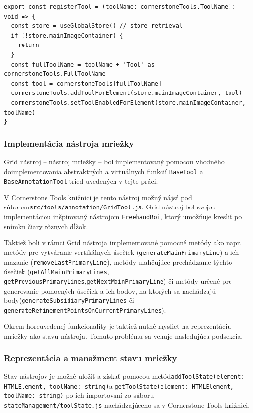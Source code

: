 \begin{minipage}[]{\linewidth}
\begin{verbatim}
export const registerTool = (toolName: cornerstoneTools.ToolName): void => {
  const store = useGlobalStore() // store retrieval
  if (!store.mainImageContainer) {
    return
  }
  const fullToolName = toolName + 'Tool' as cornerstoneTools.FullToolName
  const tool = cornerstoneTools[fullToolName]
  cornerstoneTools.addToolForElement(store.mainImageContainer, tool)
  cornerstoneTools.setToolEnabledForElement(store.mainImageContainer, toolName)
}
\end{verbatim}
\end{minipage}

\subsubsection {Implementácia nástroja mriežky}
Grid nástroj -- nástroj mriežky -- bol implementovaný pomocou vhodného doimplementovania abstraktných a virtuálnych funkcií \texttt{BaseTool} a \texttt{BaseAnnotationTool} tried uvedených v tejto práci.

V Cornerstone Tools knižnici je tento nástroj možný nájsť pod súborom\newline \texttt{src/tools/annotation/GridTool.js}. Grid nástroj bol svojou implementáciou inšpirovaný nástrojom \texttt{FreehandRoi}, ktorý umožňuje kresliť po snímku čiary rôznych dĺžok.

Taktiež boli v rámci Grid nástroja implementované pomocné metódy ako napr. metódy pre vytváranie vertikálnych úsečiek (\texttt{generateMainPrimaryLine}) a ich mazanie (\texttt{removeLastPrimaryLine}), metódy uľahčujúce prechádzanie týchto úsečiek (\texttt{getAllMainPrimaryLines}, \texttt{getPreviousPrimaryLines},\newline \texttt{getNextMainPrimaryLine}) či metódy určené pre generovanie pomocných úsečiek a ich bodov, na ktorých sa nachádzajú  body\newline (\texttt{generateSubsidiaryPrimaryLines} či \newline \texttt{generateRefinementPointsOnCurrentPrimaryLines}).

Okrem horeuvedenej funkcionality je taktiež nutné myslieť na reprezentáciu mriežky ako stavu nástroja. Tomuto problému sa venuje nasledujúca podsekcia.

\subsubsection* {Reprezentácia a manažment stavu mriežky}
Stav nástrojov je možné uložiť a získať pomocou metód\newline \texttt{addToolState(element: HTMLElement, toolName: string)}\newline a \texttt{getToolState(element: HTMLElement, toolName: string)} po ich importovaní zo súboru \texttt{stateManagement/toolState.js} nachádzajúceho sa v Cornerstone Tools knižnici.

